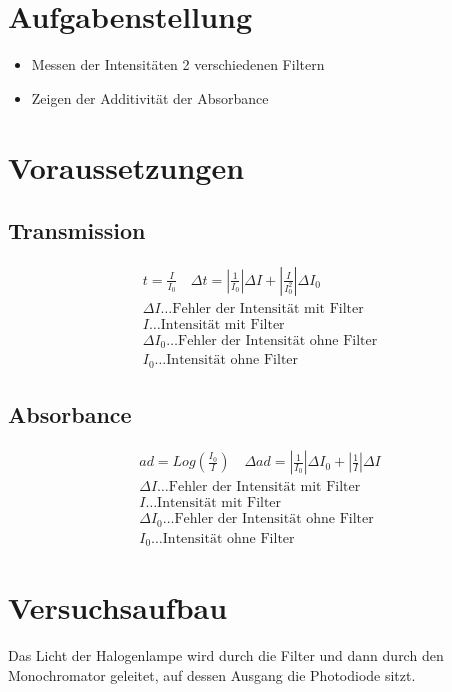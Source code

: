 \documentclass[a4paper]{article}
\begin{document}
\section{Aufgabenstellung}
\begin{itemize}
  \item Messen der Intensitäten 2 verschiedenen Filtern
  \item Zeigen der Additivität der Absorbance
\end{itemize}

\section{Voraussetzungen}
\subsection{Transmission}
\begin{align}
				t=\frac{I}{I_0} \quad  \Delta t = \left|\frac{1}{I_0}\right|\Delta I + \left| \frac{I}{I_0^2} \right| \Delta I_0 \\
				\Delta I\dots \text{Fehler der Intensität mit Filter}\\
				I\dots \text{Intensität mit Filter}\\
				\Delta I_0\dots \text{Fehler der Intensität ohne Filter}\\
				I_0\dots \text{Intensität ohne Filter}
				\label{trans}
\end{align}

\subsection{Absorbance}
\begin{align}
				ad=Log\left( \frac{I_0}{I} \right) \quad
        \Delta ad = \left| \frac{1}{I_0}\right| \Delta I_0 + \left| \frac{1}{I}\right|\Delta I\\
				\Delta I\dots \text{Fehler der Intensität mit Filter}\\
				I\dots \text{Intensität mit Filter}\\
				\Delta I_0\dots \text{Fehler der Intensität ohne Filter}\\
				I_0\dots \text{Intensität ohne Filter}
				\label{adsorb}
\end{align}


\section{Versuchsaufbau}
Das Licht der Halogenlampe wird durch die Filter und dann durch den Monochromator geleitet, auf dessen Ausgang die Photodiode sitzt. 
\end{document}
